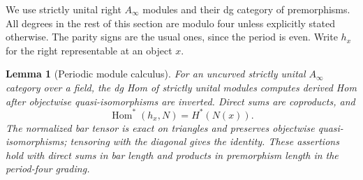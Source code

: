 \documentclass[11pt]{article}
\newtheorem{lemma}[theorem]{Lemma}
\theoremstyle{definition}
\theoremstyle{remark}
\DeclareMathOperator{\Hom}{Hom}
\numberwithin{equation}{section}
\begin{document}
We use strictly unital right $A_\infty$ modules and their dg category
of premorphisms.  All degrees in the rest of this section are modulo
four unless explicitly stated otherwise.  The parity signs are the
usual ones, since the period is even.  Write $h_x$ for the right
representable at an object $x$.

\begin{lemma}[Periodic module calculus]
\label{per:module-calculus}
For an uncurved strictly unital $A_\infty$ category over a field,
the dg Hom of strictly unital modules computes
derived Hom after objectwise quasi-isomorphisms are inverted.  Direct
sums are coproducts, and
\[
 \Hom^*(h_x,N)=H^*(N(x)).
\]
The normalized bar tensor is exact on triangles and preserves
objectwise quasi-isomorphisms; tensoring with the diagonal gives the
identity.  These assertions hold with direct sums in bar length and
products in premorphism length in the period-four grading.
\end{lemma}
\end{document}
